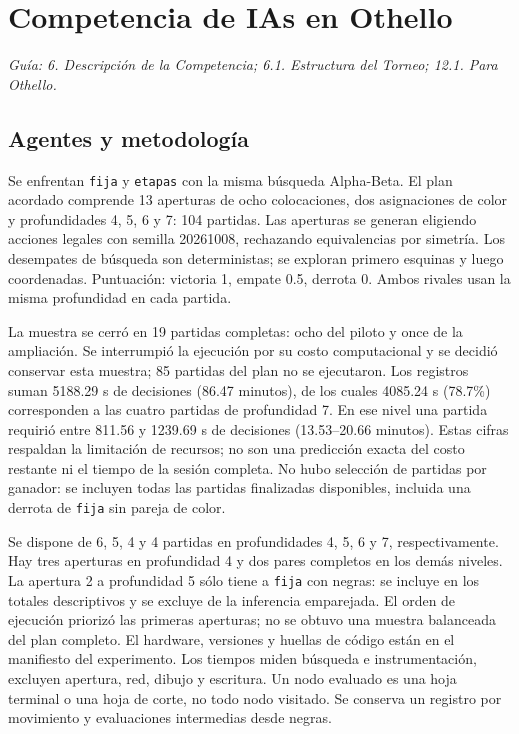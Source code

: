 \section{Competencia de IAs en Othello}
\textit{Guía: 6. Descripción de la Competencia; 6.1. Estructura del Torneo; 12.1. Para Othello.}
\subsection{Agentes y metodología}
Se enfrentan \texttt{fija} y \texttt{etapas} con la misma búsqueda Alpha-Beta. El plan acordado comprende 13 aperturas de ocho colocaciones, dos asignaciones de color y profundidades 4, 5, 6 y 7: 104 partidas. Las aperturas se generan eligiendo acciones legales con semilla 20261008, rechazando equivalencias por simetría. Los desempates de búsqueda son deterministas; se exploran primero esquinas y luego coordenadas. Puntuación: victoria 1, empate 0.5, derrota 0. Ambos rivales usan la misma profundidad en cada partida.

La muestra se cerró en 19 partidas completas: ocho del piloto y once de la ampliación. Se interrumpió la ejecución por su costo computacional y se decidió conservar esta muestra; 85 partidas del plan no se ejecutaron. Los registros suman 5188.29 s de decisiones (86.47 minutos), de los cuales 4085.24 s (78.7\%) corresponden a las cuatro partidas de profundidad 7. En ese nivel una partida requirió entre 811.56 y 1239.69 s de decisiones (13.53--20.66 minutos). Estas cifras respaldan la limitación de recursos; no son una predicción exacta del costo restante ni el tiempo de la sesión completa. No hubo selección de partidas por ganador: se incluyen todas las partidas finalizadas disponibles, incluida una derrota de \texttt{fija} sin pareja de color.

Se dispone de 6, 5, 4 y 4 partidas en profundidades 4, 5, 6 y 7, respectivamente. Hay tres aperturas en profundidad 4 y dos pares completos en los demás niveles. La apertura 2 a profundidad 5 sólo tiene a \texttt{fija} con negras: se incluye en los totales descriptivos y se excluye de la inferencia emparejada. El orden de ejecución priorizó las primeras aperturas; no se obtuvo una muestra balanceada del plan completo. El hardware, versiones y huellas de código están en el manifiesto del experimento. Los tiempos miden búsqueda e instrumentación, excluyen apertura, red, dibujo y escritura. Un nodo evaluado es una hoja terminal o una hoja de corte, no todo nodo visitado. Se conserva un registro por movimiento y evaluaciones intermedias desde negras.

